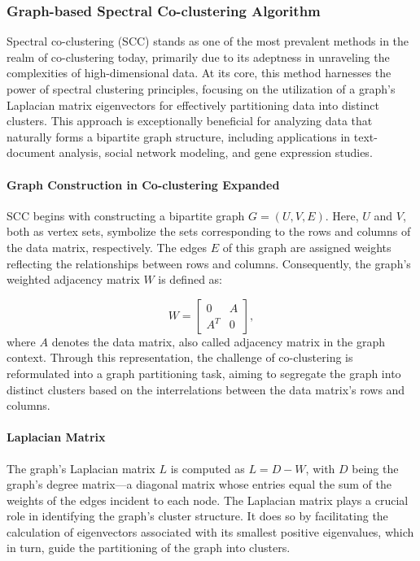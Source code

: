 \subsubsection{Graph-based Spectral Co-clustering Algorithm}

Spectral co-clustering (SCC) stands as one of the most prevalent methods in the realm of co-clustering today\cite{vonluxburg2007TutorialSpectralClustering}, primarily due to its adeptness in unraveling the complexities of high-dimensional data. At its core, this method harnesses the power of spectral clustering principles, focusing on the utilization of a graph's Laplacian matrix eigenvectors for effectively partitioning data into distinct clusters. This approach is exceptionally beneficial for analyzing data that naturally forms a bipartite graph structure, including applications in text-document analysis, social network modeling, and gene expression studies.


\paragraph{Graph Construction in Co-clustering Expanded}

SCC begins with constructing a bipartite graph $G=(U,V,E)$. Here, $U$ and $V$, both as vertex sets, symbolize the sets corresponding to the rows and columns of the data matrix, respectively. The edges $E$ of this graph are assigned weights reflecting the relationships between rows and columns. Consequently, the graph's weighted adjacency matrix $W$ is defined as:

$$ W = \begin{bmatrix} 0 & A \\ A^T & 0 \end{bmatrix}, $$
where $A$ denotes the data matrix, also called adjacency matrix in the graph context.
Through this representation, the challenge of co-clustering is reformulated into a graph partitioning task, aiming to segregate the graph into distinct clusters based on the interrelations between the data matrix's rows and columns.

\paragraph{Laplacian Matrix}

The graph's Laplacian matrix $L$ is computed as $L=D-W$, with $D$ being the graph's degree matrix—a diagonal matrix whose entries equal the sum of the weights of the edges incident to each node. The Laplacian matrix plays a crucial role in identifying the graph's cluster structure. It does so by facilitating the calculation of eigenvectors associated with its smallest positive eigenvalues, which in turn, guide the partitioning of the graph into clusters.

